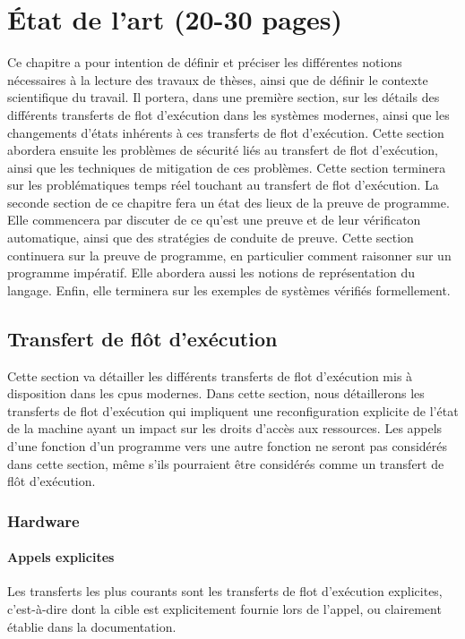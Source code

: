 \chapter{État de l'art (20-30 pages)}

	Ce chapitre a pour intention de définir et préciser les différentes notions nécessaires à la lecture des travaux de thèses, ainsi que de définir le contexte scientifique du travail. Il portera, dans une première section, sur les détails des différents transferts de flot d'exécution dans les systèmes modernes, ainsi que les changements d'états inhérents à ces transferts de flot d'exécution. Cette section abordera ensuite les problèmes de sécurité liés au transfert de flot d'exécution, ainsi que les techniques de mitigation de ces problèmes. Cette section terminera sur les problématiques temps réel touchant au transfert de flot d'exécution.
	La seconde section de ce chapitre fera un état des lieux de la preuve de programme. Elle commencera par discuter de ce qu'est une preuve et de leur vérificaton automatique, ainsi que des stratégies de conduite de preuve. Cette section continuera sur la preuve de programme, en particulier comment raisonner sur un programme impératif. Elle abordera aussi les notions de représentation du langage. Enfin, elle terminera sur les exemples de systèmes vérifiés formellement.

	\section{Transfert de flôt d'exécution}

		Cette section va détailler les différents transferts de flot d'exécution mis à disposition dans les cpus modernes.
		Dans cette section, nous détaillerons les transferts de flot d'exécution qui impliquent une reconfiguration explicite de l'état de la machine ayant un impact sur les droits d'accès aux ressources. Les appels d'une fonction d'un programme vers une autre fonction ne seront pas considérés dans cette section, même s'ils pourraient être considérés comme un transfert de flôt d'exécution. 


		\subsection{Hardware}

			\subsubsection{Appels explicites}
			Les transferts les plus courants sont les transferts de flot d'exécution explicites, c'est-à-dire dont la cible est explicitement fournie lors de l’appel, ou clairement établie dans la documentation.

